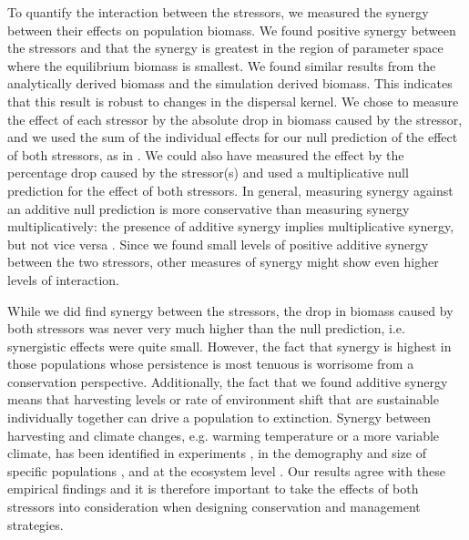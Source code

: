 \documentclass[12pt,english]{article}
\begin{document}
\begin{spacing}{1.9}
\begin{flushleft}

To quantify the interaction between the stressors, we measured the synergy between their effects on population biomass.  We found positive synergy between the stressors and that the synergy is greatest in the region of parameter space where the equilibrium biomass is smallest.  We found similar results from the analytically derived biomass and the simulation derived biomass. This indicates that this result is robust to changes in the dispersal kernel.  We chose to measure the effect of each stressor by the absolute drop in biomass caused by the stressor, and we used the sum of the individual effects for our null prediction of the effect of both stressors, as in \citep{Crainetal2008, DarlingCote2008,Nyeetal2013}.  We could also have measured the effect by the percentage drop caused by the stressor(s) and used a multiplicative null prediction for the effect of both stressors.  In general, measuring synergy against an additive null prediction is more conservative than measuring synergy multiplicatively: the presence of additive synergy implies multiplicative synergy, but not vice versa \citep{Crainetal2008, Foltetal1999}.  Since we found small levels of positive additive synergy between the two stressors, other measures of synergy might show even higher levels of interaction. 

While we did find synergy between the stressors, the drop in biomass caused by both stressors was never very much higher than the null prediction, i.e. synergistic effects were quite small.  However, the fact that synergy is highest in those populations whose persistence is most tenuous is worrisome from a conservation perspective.  Additionally, the fact that we found additive synergy means that harvesting levels or rate of environment shift that are sustainable individually together can drive a population to extinction.  Synergy between harvesting and climate changes, e.g. warming temperature or a more variable climate, has been identified in experiments \citep{Moraetal2007}, in the demography and size of specific populations \citep{Planque:2010uq}, and at the ecosystem level \citep{Kirby:2009fk}.  Our results  agree with these empirical findings and it is therefore important to take the effects of both stressors into consideration when designing conservation and management strategies.


\end{flushleft}
\end{spacing}
\end{document}
